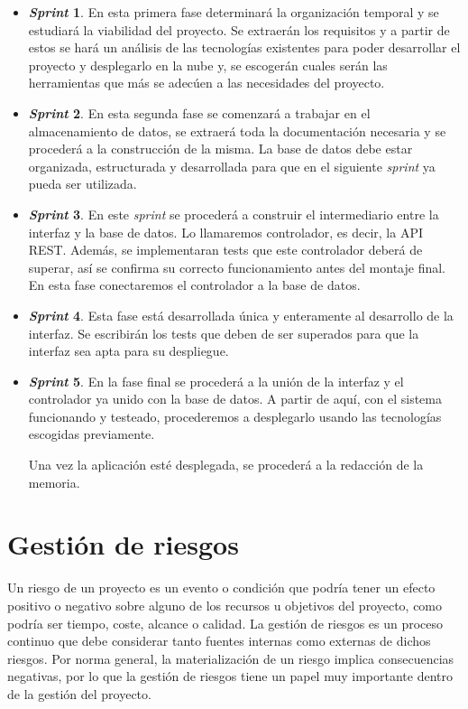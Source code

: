 \begin{itemize}
    \item \textbf{\textit{Sprint} 1}. En esta primera fase determinará la organización temporal y se estudiará la viabilidad del proyecto. Se extraerán los requisitos y a partir de estos se hará un análisis de las tecnologías existentes para poder desarrollar el proyecto y desplegarlo en la nube y, se escogerán cuales serán las herramientas que más se adecúen a las necesidades del proyecto.
    
    \item \textbf{\textit{Sprint} 2}. En esta segunda fase se comenzará a trabajar en el almacenamiento de datos, se extraerá toda la documentación necesaria y se procederá a la construcción de la misma. La base de datos debe estar organizada, estructurada y desarrollada para que en el siguiente \textit{sprint} ya pueda ser utilizada.
    \item \textbf{\textit{Sprint} 3}. En este \textit{sprint} se procederá a construir el intermediario entre la interfaz y la base de datos. Lo llamaremos controlador, es decir, la API REST. Además, se implementaran tests que este controlador deberá de superar, así se confirma su correcto funcionamiento antes del montaje final. En esta fase conectaremos el controlador a la base de datos.
    \item \textbf{\textit{Sprint} 4}. Esta fase está desarrollada única y enteramente al desarrollo de la interfaz. Se escribirán los tests que deben de ser superados para que la interfaz sea apta para su despliegue.
    \item \textbf{\textit{Sprint} 5}. En la fase final se procederá a la unión de la interfaz y el controlador ya unido con la base de datos. A partir de aquí, con el sistema funcionando y testeado, procederemos a desplegarlo usando las tecnologías escogidas previamente. 
    
    Una vez la aplicación esté desplegada, se procederá a la redacción de la memoria.
\end{itemize}

\section{Gestión de riesgos}
Un riesgo de un proyecto es un evento o condición  que podría tener un efecto positivo o negativo sobre alguno de los recursos u objetivos del proyecto, como podría ser tiempo, coste, alcance o calidad. La gestión de riesgos es un proceso continuo que debe considerar tanto fuentes internas como externas de dichos riesgos. Por norma general, la materialización de un riesgo implica consecuencias negativas, por lo que la gestión de riesgos tiene un papel muy importante dentro de la gestión del proyecto. 

